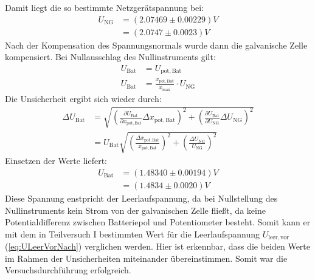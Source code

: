 \documentclass{report}
\begin{document}
Damit liegt die so bestimmte Netzgerätspannung bei:
\begin{equation}
    \begin{split}
        U_{\mathrm{NG}} &= (2.07469 \pm 0.00229) \si{V} \\
                        &= (2.0747 \pm 0.0023) \si{V}
    \end{split}
\end{equation}
Nach der Kompensation des Spannungsnormals wurde dann die galvanische Zelle kompensiert. 
Bei Nullausschlag des Nullinstruments gilt:
\begin{equation}
    \begin{split}
        U_{\mathrm{Bat}} &= U_{\mathrm{pot, Bat}} \\
        U_{\mathrm{Bat}} &= \frac{x_{\mathrm{pot, Bat}}}{x_{\mathrm{max}}} \cdot U_{\mathrm{NG}}
    \end{split}
\end{equation}
Die Unsicherheit ergibt sich wieder durch:
\begin{equation}
    \begin{split}
        \Delta U_{\mathrm{Bat}} &= \sqrt{\left(\frac{\partial U_{\mathrm{Bat}}}{\partial x_{\mathrm{pot, Bat}}}\Delta x_{\mathrm{pot, Bat}}\right)^2
                                        + \left(\frac{\partial U_{\mathrm{Bat}}}{\partial U_{\mathrm{NG}}}\Delta U_{\mathrm{NG}}\right)^2} \\
                                &= U_{\mathrm{Bat}} \sqrt{\left(\frac{\Delta x_{\mathrm{pot, Bat}}}{x_{\mathrm{pot, Bat}}}\right)^2 + \left(\frac{\Delta U_{\mathrm{NG}}}{U_{\mathrm{NG}}}\right)^2}
    \end{split}
\end{equation}
Einsetzen der Werte liefert:
\begin{equation}
    \begin{split}
        U_{\mathrm{Bat}} &= (1.48340 \pm 0.00194) \si{V} \\
                         &= (1.4834 \pm 0.0020) \si{V}
    \end{split}
\end{equation}
Diese Spannung enstpricht der Leerlaufspannung, da bei Nullstellung des Nullinstruments kein Strom von der galvanischen Zelle fließt, da keine Potentialdifferenz zwischen 
Batteriepol und Potentiometer besteht. 
Somit kann er mit dem in Teilversuch I bestimmten Wert für die Leerlaufspannung $U_{\mathrm{leer, vor}}$ (\ref{eq:ULeerVorNach}) verglichen werden.
Hier ist erkennbar, dass die beiden Werte im Rahmen der Unsicherheiten miteinander übereinstimmen. Somit war die Versuchsdurchführung erfolgreich.
\newpage
\end{document}
